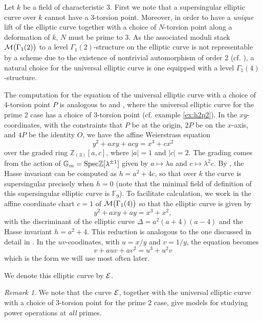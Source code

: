 \documentclass{gtpart}
\theoremstyle{definition}
\theoremstyle{remark}
\newtheorem{rmk}[thm]{Remark}
\newcommand{\mb}[1]{\mathbb{#1}}
\newcommand{\Spec}{{\rm Spec}}
\newcommand{\Gm}{{{\mb G}_m}}
\begin{document}
Let $k$ be a field of characteristic 3.  First we note that a 
supersingular elliptic curve over $k$ cannot have a 3-torsion point.  
Moreover, in order to have a {\em unique} lift of the elliptic curve together 
with a choice of $N$-torsion point along a deformation of $k$, $N$ must be 
prime to 3.  As the associated moduli stack 
${\cal M}\big(\Gamma_1(2)\big)$ to a level $\Gamma_1(2)$-structure on the 
elliptic curve is not representable by a scheme due to the existence of 
nontrivial automorphism of order 2 (cf. 
\cite[corollaries 4.7.2 and 2.7.2]{katzmazur}), a natural choice for 
the universal elliptic curve is one equipped with a level 
$\Gamma_1(4)$-structure.  

The computation for the equation of the universal elliptic curve with a 
choice of 4-torsion point $P$ is analogous to \cite[2.2.10]{katzmazur} 
and \cite[proposition 3.2]{tmf3}, where the universal elliptic curve for the prime 2 case has a choice of 3-torsion point (cf. example \ref{ex:h2p2}).  In the 
$xy$-coordinates, with the constraints that $P$ be at the origin, $2P$ be 
on the $x$-axis, and $4P$ be the identity $O$, we have the affine 
Weierstrass equation 
\[
 y^2 + a x y + a c y = x^3 + c x^2
\]
over the graded ring ${\mb Z}_{(3)}[a,c]$, where $|a| = 1$ and $|c| = 2$.  
The grading comes from the action of $\Gm = 
\Spec {\mb Z}[\lambda^{\pm1}]$ given by $a \mapsto \lambda a$ and 
$c \mapsto \lambda^2 c$.  By \cite[V.4.1(a)]{AEC}, the Hasse 
invariant can be computed as $h = a^2 + 4c$, so that over $k$ the curve 
is supersingular precisely when $h = 0$ (note that the minimal field of definition of this supersingular elliptic curve is ${\mb F}_9$).  To facilitate calculation, we 
work in the affine coordinate chart $c = 1$ of 
${\cal M}\big(\Gamma_1(4)\big)$ so that the elliptic curve is given by 
\[
 y^2 + a x y + a y = x^3 + x^2,
\]
with the discriminant of the elliptic curve $\Delta = a^2(a + 4)(a - 4)$ 
and the Hasse invariant $h = a^2 + 4$.  This reduction is analogous to 
the one discussed in detail in \cite[section 4]{level3}.  In the
$uv$-coodinates, with $u = x/y$ and $v = 1/y$, the equation becomes 
\[
 v + a u v + a v^2 = u^3 + u^2 v
\]
which is the form we will use most often later.  

We denote this elliptic curve by $\cal E$.  

\begin{rmk}
 We note that the curve $\cal E$, together with the universal elliptic curve with a choice of 
 3-torsion point for the prime 2 case, give models for studying power operations at
 {\em all} primes.  
\end{rmk}
\end{document}
